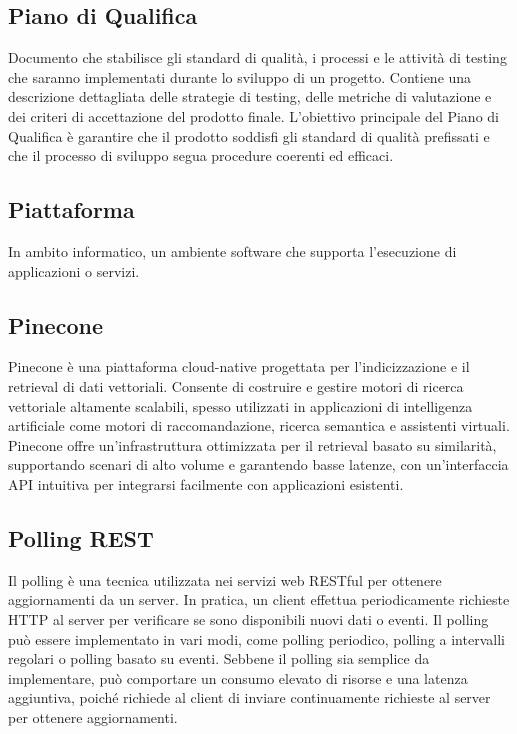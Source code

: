 \subsection*{Piano di Qualifica}
Documento che stabilisce gli standard di qualità, i processi e le attività di testing che saranno implementati durante lo sviluppo di un progetto. 
Contiene una descrizione dettagliata delle strategie di testing, delle metriche di valutazione e dei criteri di accettazione del prodotto finale. 
L’obiettivo principale del Piano di Qualifica è garantire che il prodotto soddisfi gli standard di qualità prefissati e che il processo di sviluppo 
segua procedure coerenti ed efficaci.

\hypertarget{sec:piattaforma}{}
\subsection*{Piattaforma}
In ambito informatico, un ambiente software che supporta l’esecuzione di applicazioni o servizi.

\hypertarget{sec:pinecone}{}
\subsection*{Pinecone}
Pinecone è una piattaforma cloud-native progettata per l'indicizzazione e il retrieval di dati vettoriali. Consente di costruire e gestire motori di 
ricerca vettoriale altamente scalabili, spesso utilizzati in applicazioni di intelligenza artificiale come motori di raccomandazione, ricerca semantica 
e assistenti virtuali. Pinecone offre un'infrastruttura ottimizzata per il retrieval basato su similarità, supportando scenari di alto volume e 
garantendo basse latenze, con un'interfaccia API intuitiva per integrarsi facilmente con applicazioni esistenti.

\hypertarget{sec:polling_rest}{}
\subsection*{Polling REST}
Il polling è una tecnica utilizzata nei servizi web RESTful per ottenere aggiornamenti da un server. In pratica, un client effettua periodicamente
richieste HTTP al server per verificare se sono disponibili nuovi dati o eventi. Il polling può essere implementato in vari modi, come polling
periodico, polling a intervalli regolari o polling basato su eventi. Sebbene il polling sia semplice da implementare, può comportare un consumo
elevato di risorse e una latenza aggiuntiva, poiché richiede al client di inviare continuamente richieste al server per ottenere aggiornamenti.

